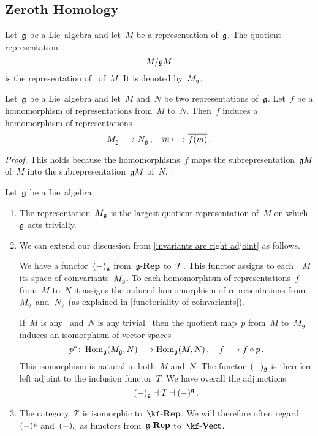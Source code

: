 \subsection{Zeroth Homology}

\begin{definition}
  Let~$\glie$ be a Lie~algebra and let~$M$ be a representation of~$\glie$.
  The quotient representation
  \[
    M / \mathfrak{g} M
  \]
  is the representation of~ of~$M$.
  It is denoted by~$M_{\mathfrak{g}}$.
\end{definition}


\begin{proposition}
  \label{functoriality of coinvariants}
  Let~$\glie$ be a Lie~algebra and let~$M$ and~$N$ be two representations of~$\glie$.
  Let~$f$ be a homomorphism of representations from~$M$ to~$N$.
  Then~$f$ induces a homomorphism of representations
  \[
    M_{\glie}
    \to
    N_{\glie} \,,
    \quad
    \class{m}
    \mapsto
    \class{f(m)} \,.
  \]
\end{proposition}


\begin{proof}
  This holds because the homomorphisms~$f$ maps the subrepresentation~$\mathfrak{g} M$ of~$M$ into the subrepresentation~$\mathfrak{g} M$ of~$N$.
\end{proof}


\begin{remark}
  Let~$\glie$ be a Lie~algebra.
  \begin{enumerate}
    \item
      The representation~$M_{\mathfrak{g}}$ is the largest quotient representation of~$M$ on which~$\glie$ acts trivially.
    \item
      We can extend our discussion from \cref{invariants are right adjoint} as follows.

      We have a functor~$(-)_{\mathfrak{g}}$ from~$\mathfrak{g}\text{-}\mathbf{Rep}$ to~$\mathcal{T}$.
      This functor assigns to each~\representation{$\glie$}~$M$ its space of coinvariants~$M_{\mathfrak{g}}$.
      To each homomorphism of representations~$f$ from~$M$ to~$N$ it assigns the induced homomorphism of representations from~$M_{\mathfrak{g}}$ and~$N_{\mathfrak{g}}$ (as explained in \cref{functoriality of coinvariants}).

      If~$M$ is any~\representation{$\glie$} and~$N$ is any trivial~\representation{$\glie$} then the quotient map~$p$ from~$M$ to~$M_{\mathfrak{g}}$ induces an isomorphism of vector spaces
      \[
        p^*
        \colon
        \Hom_{\glie}(M_{\glie}, N)
        \to
        \Hom_{\glie}(M, N) \,,
        \quad
        f
        \mapsto
        f \circ p \,.
      \]
      This isomorphism is natural in both~$M$ and~$N$.
      The functor~$(-)_{\mathfrak{g}}$ is therefore left adjoint to the inclusion functor~$T$.
      We have overall the adjunctions
      \[
        (-)_{\mathfrak{g}}
        \dashv
        T
        \dashv
        (-)^{\mathfrak{g}} \,.
      \]
    \item
      The category~$\mathcal{T}$ is isomorphic to~$\cRep{\kf}$.
      We will therefore often regard~$(-)^{\mathfrak{g}}$ and~$(-)_{\mathfrak{g}}$ as functors from~$\mathfrak{g}\text{-}\mathbf{Rep}$ to~$\cVect{\kf}$.
  \end{enumerate}
\end{remark}


